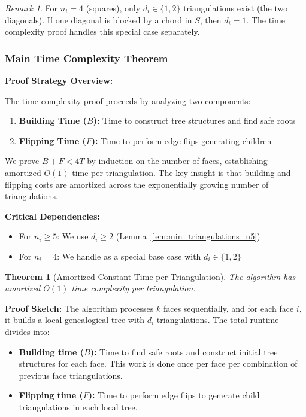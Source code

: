 \documentclass[12pt,a4paper]{article}
\newtheorem{theorem}{Theorem}
\theoremstyle{definition}
\theoremstyle{remark}
\newtheorem{remark}{Remark}
\begin{document}
\begin{remark}
For $n_i = 4$ (squares), only $d_i \in \{1, 2\}$ triangulations exist (the two diagonals). If one diagonal is blocked by a chord in $S$, then $d_i = 1$. The time complexity proof handles this special case separately.
\end{remark}

\subsubsection{Main Time Complexity Theorem}

\textbf{Proof Strategy Overview:}

The time complexity proof proceeds by analyzing two components:
\begin{enumerate}
    \item \textbf{Building Time ($B$):} Time to construct tree structures and find safe roots
    \item \textbf{Flipping Time ($F$):} Time to perform edge flips generating children
\end{enumerate}

We prove $B + F < 4T$ by induction on the number of faces, establishing amortized $O(1)$ time per triangulation. The key insight is that building and flipping costs are amortized across the exponentially growing number of triangulations.

\textbf{Critical Dependencies:}
\begin{itemize}
    \item For $n_i \geq 5$: We use $d_i \geq 2$ (Lemma~\ref{lem:min_triangulations_n5})
    \item For $n_i = 4$: We handle as a special base case with $d_i \in \{1, 2\}$
\end{itemize}

\begin{theorem}[Amortized Constant Time per Triangulation]
\label{thm:time_complexity}
The algorithm has amortized $O(1)$ time complexity per triangulation.
\end{theorem}

\textbf{Proof Sketch:} The algorithm processes $k$ faces sequentially, and for each face $i$, it builds a local genealogical tree with $d_i$ triangulations. The total runtime divides into:
\begin{itemize}
    \item \textbf{Building time ($B$):} Time to find safe roots and construct initial tree structures for each face. This work is done once per face per combination of previous face triangulations.
    \item \textbf{Flipping time ($F$):} Time to perform edge flips to generate child triangulations in each local tree.
\end{itemize}
\end{document}
